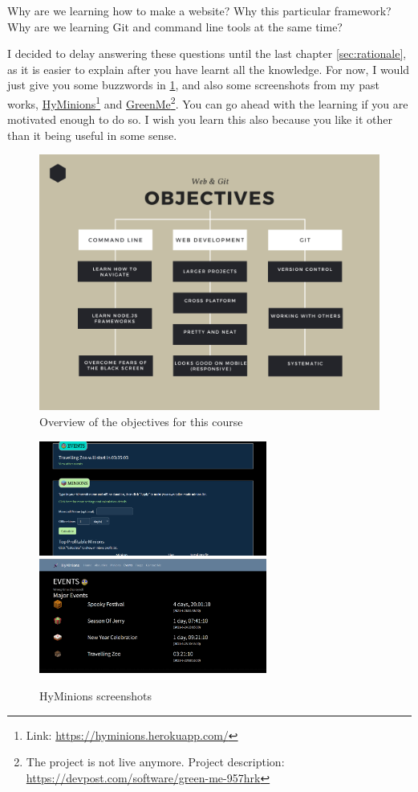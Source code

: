 Why are we learning how to make a website? Why this particular framework? Why are we learning Git and command line tools at the same time?

I decided to delay answering these questions until the last chapter \cref{sec:rationale}, as it is easier to explain after you have learnt all the knowledge. For now, I would just give you some buzzwords in \cref{fig:objective}, and also some screenshots from my past works, \href{https://hyminions.herokuapp.com/}{HyMinions}\footnote{Link: \href{https://hyminions.herokuapp.com/}{https://hyminions.herokuapp.com/}} and \href{https://devpost.com/software/green-me-957hrk}{GreenMe}\footnote{The project is not live anymore. Project description: \href{https://devpost.com/software/green-me-957hrk}{https://devpost.com/software/green-me-957hrk}}. You can go ahead with the learning if you are motivated enough to do so. I wish you learn this also because you like it other than it being useful in some sense.

\begin{figure}[H]
\centering
\includegraphics[width=15cm]{images/chn0-objectives.png}
\caption{Overview of the objectives for this course}
\label{fig:objective}
\end{figure}

\newpage
\begin{figure}[H]
\centering
\includegraphics[width=7.5cm]{images/chn0-code-hyminions-1.png}
\includegraphics[width=7.5cm]{images/chn0-code-hyminions-2.png}
\caption{HyMinions screenshots}
\end{figure}

